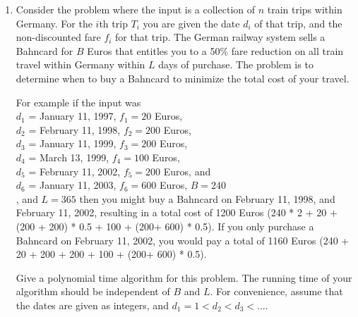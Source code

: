 \documentclass[letterpaper,12pt]{article}
\begin{document}
\begin{enumerate}
    







\item 
Consider the problem where the input is a collection of $n$ train
trips within Germany. For the $i$th trip $T_i$ you are given the date $d_i$ of
that trip, and the non-discounted fare $f_i$ for that trip.
The German railway system sells a Bahncard for $B$ Euros that
entitles you to a 50\% fare reduction on all train travel
within Germany within $L$ days of purchase.
The problem is to determine when to buy a Bahncard to minimize the
total cost of your travel.
 
For example if the input was \\
$d_1$ = January 11, 1997, $f_1=20$ Euros, \\
$d_2$ = February 11, 1998, $f_2=200$ Euros, \\
$d_3$ = January 11, 1999, $f_3=200$ Euros, \\
$d_4$ = March 13, 1999, $f_4=100$ Euros, \\
$d_5$ = February 11, 2002, $f_5=200$ Euros, and \\
$d_6$ = January 11, 2003, $f_6=600$ Euros, $B=240$\\
, and $L=365$ then
you might buy a Bahncard on February 11, 1998, and
February 11, 2002, resulting in a total cost of
1200 Euros (240 * 2 + 20 + (200 + 200) * 0.5 + 100 + (200+ 600) * 0.5). If you only purchase a Bahncard on 
February 11, 2002, you would pay a total of 1160 Euros (240 + 20 + 200 + 200 + 100 + (200+ 600) * 0.5).
 
Give a polynomial time algorithm for this problem.
The running time of your algorithm should be independent of
$B$ and $L$. For convenience, assume that the dates are given as integers, and 
$d_1 = 1 < d_2 < d_3 < \ldots$. 

\end{enumerate}
\end{document}
